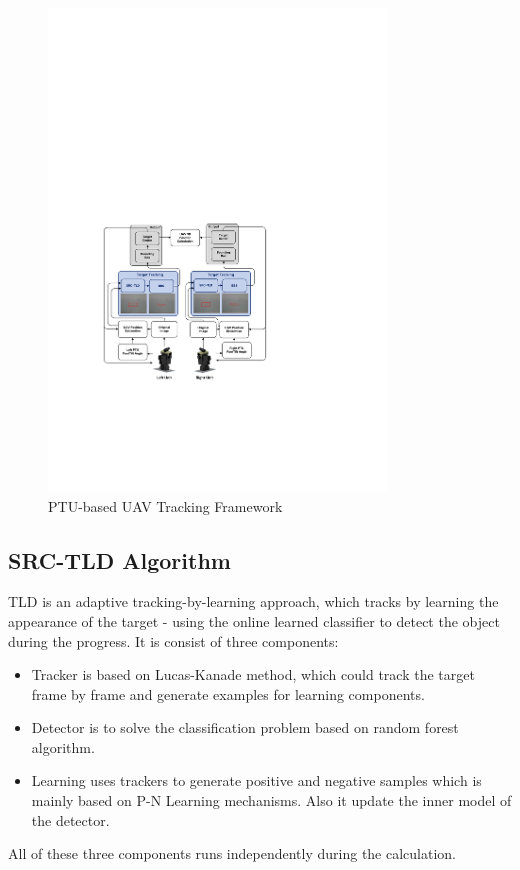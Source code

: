 \begin{figure}[!th]
	\centering
	\includegraphics[width=0.8\textwidth]{Figs/sci01_tracking_framework2.pdf}	
	\caption{PTU-based UAV Tracking Framework}
	\label{fig:sci01_tracking_framework}
\end{figure}

\subsection{SRC-TLD Algorithm}
TLD is an adaptive tracking-by-learning approach, which tracks by learning the appearance of the target - using the online learned classifier to detect the object during the progress. It is consist of three components: 
\begin{itemize}
	\item Tracker is based on Lucas-Kanade method, which could track the target frame by frame and generate examples for learning components.
	
	\item Detector is to solve the classification problem based on random forest algorithm.
	
	\item Learning uses trackers to generate positive and negative samples which is mainly based on P-N Learning mechanisms. Also it update the inner model of the detector.
\end{itemize}
All of these three components runs independently during the calculation.

